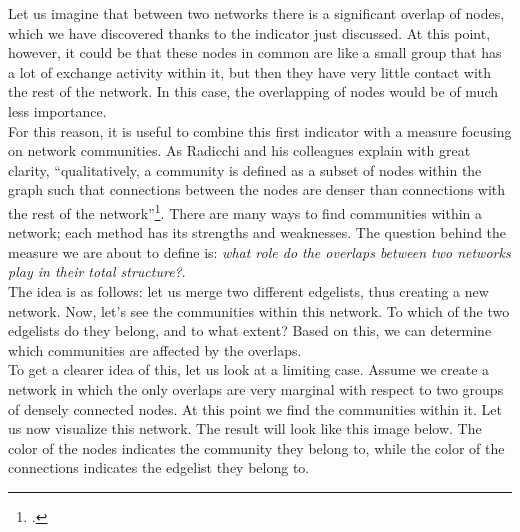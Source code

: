 \documentclass[a4paper,twoside,12pt, openany]{book}
\begin{document}
Let us imagine that between two networks there is a significant overlap of nodes, which we have discovered thanks to the indicator just discussed. At this point, however, it could be that these nodes in common are like a small group that has a lot of exchange activity within it, but then they have very little contact with the rest of the network. In this case, the overlapping of nodes would be of much less importance. \\
For this reason, it is useful to combine this first indicator with a measure focusing on network communities. As Radicchi and his colleagues explain with great clarity, \enquote{qualitatively, a community is defined as a subset of nodes within the graph such that connections between the nodes are denser than connections with the rest of the network}\footcite{radicchi2004}. There are many ways to find communities within a network; each method has its strengths and weaknesses. The question behind the measure we are about to define is: \emph{what role do the overlaps between two networks play in their total structure?}.\\
The idea is as follows: let us merge two different edgelists, thus creating a new network. Now, let's see the communities within this network. To which of the two edgelists do they belong, and to what extent? Based on this, we can determine which communities are affected by the overlaps. \\
To get a clearer idea of this, let us look at a limiting case. Assume we create a network in which the only overlaps are very marginal with respect to two groups of densely connected nodes. At this point we find the communities within it. Let us now visualize this network. The result will look like this image below. The color of the nodes indicates the community they belong to, while the color of the connections indicates the edgelist they belong to. 
\pagebreak
\end{document}
